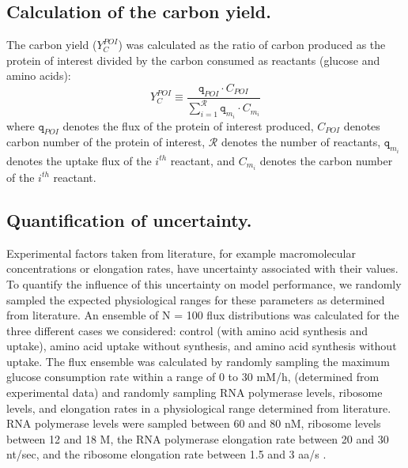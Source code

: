 \documentclass[journal=asbcd6,manuscript=article]{achemso}
\begin{document}
\subsection*{Calculation of the carbon yield.}
The carbon yield ($Y_{C}^{POI}$) was calculated as the ratio of carbon produced as the protein of interest divided by the carbon consumed as reactants (glucose and amino acids):
\begin{equation}\label{eqn:yield-definition}
	Y_{C}^{POI}\equiv\frac{\texttt{q}_{POI}\cdot C_{POI}}{\displaystyle\sum_{i=1}^{\mathcal{R}} \texttt{q}_{m_{i}}\cdot C_{m_i}}
\end{equation}
where $\texttt{q}_{POI}$ denotes the flux of the protein of interest produced, $C_{POI}$ denotes carbon number of the protein of interest, $\mathcal{R}$ denotes the number of reactants,
$\texttt{q}_{m_{i}}$ denotes the uptake flux of the $i^{th}$ reactant, and $C_{m_i}$ denotes the carbon number of the $i^{th}$ reactant.


\subsection*{Quantification of uncertainty.}
Experimental factors taken from literature, for example macromolecular concentrations or elongation rates, have uncertainty associated with their values.
To quantify the influence of this uncertainty on model performance, we randomly sampled the expected physiological ranges for these parameters as determined from literature.
An ensemble of N = 100 flux distributions was calculated for the three different cases we considered:
control (with amino acid synthesis and uptake), amino acid uptake without synthesis, and amino acid synthesis without uptake.
The flux ensemble was calculated by randomly sampling the maximum glucose consumption rate within a range of 0 to 30 mM/h, (determined from experimental data)
and randomly sampling RNA polymerase levels, ribosome levels, and elongation rates in a physiological range determined from literature.
RNA polymerase levels were sampled between 60 and 80 nM, ribosome levels between 12 and 18 \textmu M, the RNA polymerase elongation rate between 20 and 30 nt/sec, and the ribosome elongation rate between 1.5 and 3 aa/s
\cite{2005_underwood_biotech, Garamella:2016aa}.
\end{document}
